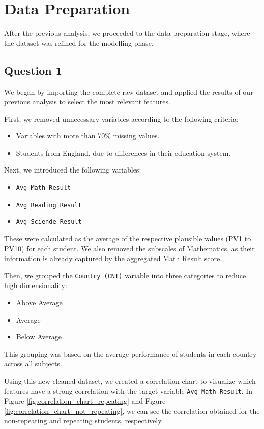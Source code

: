 \section{Data Preparation}\label{sec:data_preparation}

After the previous analysis, we proceeded to the data preparation stage, where the dataset was refined for the modelling phase.

\subsection{Question 1}

We began by importing the complete raw dataset and applied the results of our previous analysis to select the most relevant features.

First, we removed unnecessary variables according to the following criteria:
\begin{itemize}
    \itemsep0em
    \item Variables with more than 70\% missing values.
    \item Students from England, due to differences in their education system.
\end{itemize}

\noindent
Next, we introduced the following variables:
\begin{itemize}
    \itemsep0em
    \item \texttt{Avg Math Result}
    \item \texttt{Avg Reading Result}
    \item \texttt{Avg Sciende Result}
\end{itemize}

\noindent
These were calculated as the average of the respective plausible values (PV1 to PV10) for each student.
We also removed the subscales of Mathematics, as their information is already captured by the aggregated Math Result score.

Then, we grouped the \texttt{Country (CNT)} variable into three categories to reduce high dimensionality:
\begin{itemize}
    \itemsep0em
    \item Above Average
    \item Average
    \item Below Average
\end{itemize}
This grouping was based on the average performance of students in each country across all subjects.

Using this new cleaned dataset, we created a correlation chart to visualize which features have a strong correlation with the target variable \texttt{Avg Math Result}.
In Figure \ref{fig:correlation_chart_repeating} and Figure \ref{fig:correlation_chart_not_repeating}, we can see the correlation obtained for the non-repeating and repeating students, respectively.

